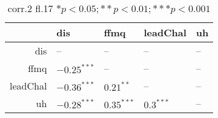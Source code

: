 \begin{table}[ht]
\centering
\begin{tabular}{rllll}
  \hline
 & dis & ffmq & leadChal & uh \\ 
  \hline
dis & -- & -- & -- & -- \\ 
  ffmq & $-0.25^{***}$ & -- & -- & -- \\ 
  leadChal & $-0.36^{***}$ & $0.21^{**}$ & -- & -- \\ 
  uh & $-0.28^{***}$ & $0.35^{***}$ & $0.3^{***}$ & -- \\ 
   \hline
\end{tabular}
\caption{corr.2 fl.17 $* p < 0.05; ** p < 0.01; *** p < 0.001$} 
\label{freq_corr.corr.2.fl.17}
\end{table}
